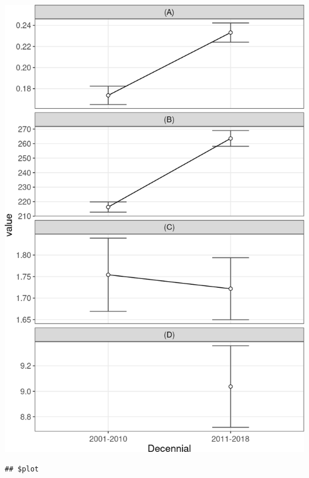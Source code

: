 \documentclass[10pt,landscape,a3paper]{article}
\begin{document}
\begin{center}\includegraphics{img/modelling/aa-eda-ts-19} \end{center}

\begin{verbatim}
## $plot
\end{verbatim}
\end{document}
